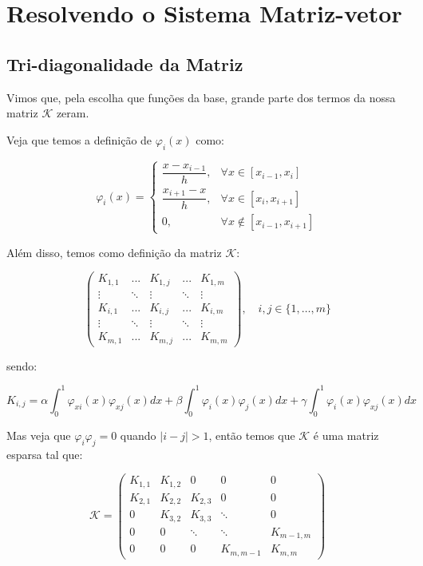 
\chapter{Resolvendo o Sistema Matriz-vetor}
\section{Tri-diagonalidade da Matriz}

Vimos que, pela escolha que funções da base, grande parte dos termos da nossa matriz $\mathcal{K}$ zeram.

Veja que temos a definição de $\varphi_i(x)$ como:

\[\varphi_i(x) = \begin{cases}
  \dfrac{x - x_{i-1}}{h}, &\forall x \in [x_{i-1}, x_i] \\
  \dfrac{x_{i+1} - x}{h}, &\forall x \in [x_{i}, x_{i+1}] \\
  0 , &\forall x \notin [x_{i-1}, x_{i+1}]
\end{cases}\]

Além disso, temos como definição da matriz $\mathcal{K}$:

\[
  \begin{pmatrix}
    K_{1,1} & ... & K_{1,j} & ... & K_{1,m} \\
    \vdots & \ddots & \vdots & \ddots & \vdots \\
    K_{i,1} & ... & K_{i,j} & ... & K_{i,m} \\
    \vdots & \ddots & \vdots & \ddots & \vdots \\
    K_{m,1} & ... & K_{m,j} & ... & K_{m,m}
  \end{pmatrix},\quad i, j \in \{1, \dots, m\}
\]

sendo:

\[K_{i,j} = \alpha \int_{0}^{1} \varphi_{xi}(x) \varphi_{xj}(x)dx + \beta \int_{0}^{1} \varphi_i(x) \varphi_j(x)dx + \gamma \int_{0}^{1} \varphi_i(x) \varphi_{xj}(x)dx \]

Mas veja que $\varphi_i \varphi_j = 0$ quando $|i - j| > 1$, então temos que $\mathcal{K}$ é uma matriz esparsa tal que:

\[
  \mathcal{K} =
  \begin{pmatrix}
    K_{1,1} & K_{1,2} & 0       & 0 & 0 \\
    K_{2,1} & K_{2,2} & K_{2,3} & 0 & 0 \\
    0       & K_{3,2} & K_{3,3} & \ddots & 0   \\
    0  & 0  & \ddots  & \ddots & K_{m-1,m} \\
    0  & 0  &  0      & K_{m,m-1} & K_{m,m}
  \end{pmatrix}
\]

